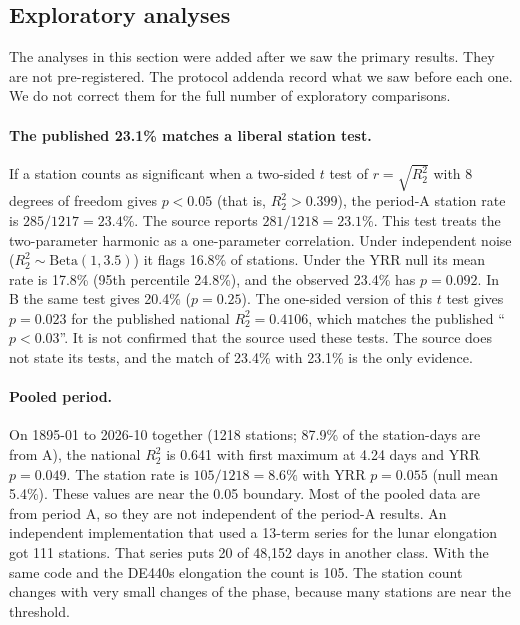 \documentclass[11pt]{article}
\newcommand{\Rtwo}{R^2_2}
\begin{document}
\subsection{Exploratory analyses}
The analyses in this section were added after we saw the primary results. They are not pre-registered. The protocol addenda record what we saw before each one. We do not correct them for the full number of exploratory comparisons.

\paragraph{The published 23.1\% matches a liberal station test.} If a station counts as significant when a two-sided $t$ test of $r=\sqrt{\Rtwo}$ with 8 degrees of freedom gives $p<0.05$ (that is, $\Rtwo>0.399$), the period-A station rate is $285/1217=23.4\%$. The source reports $281/1218=23.1\%$. This test treats the two-parameter harmonic as a one-parameter correlation. Under independent noise ($\Rtwo\sim\mathrm{Beta}(1,3.5)$) it flags 16.8\% of stations. Under the YRR null its mean rate is 17.8\% (95th percentile 24.8\%), and the observed 23.4\% has $p=0.092$. In B the same test gives 20.4\% ($p=0.25$). The one-sided version of this $t$ test gives $p=0.023$ for the published national $\Rtwo=0.4106$, which matches the published ``$p<0.03$''. It is not confirmed that the source used these tests. The source does not state its tests, and the match of 23.4\% with 23.1\% is the only evidence.

\paragraph{Pooled period.} On 1895-01 to 2026-10 together (1218 stations; 87.9\% of the station-days are from A), the national $\Rtwo$ is 0.641 with first maximum at 4.24 days and YRR $p=0.049$. The station rate is $105/1218=8.6\%$ with YRR $p=0.055$ (null mean 5.4\%). These values are near the 0.05 boundary. Most of the pooled data are from period A, so they are not independent of the period-A results. An independent implementation that used a 13-term series for the lunar elongation got 111 stations. That series puts 20 of 48,152 days in another class. With the same code and the DE440s elongation the count is 105. The station count changes with very small changes of the phase, because many stations are near the threshold.
\end{document}

